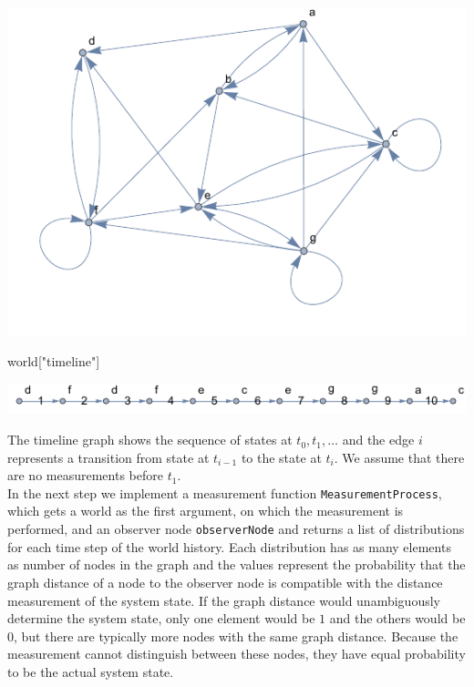 \documentclass{tstextbook}
\begin{document}
\begin{example}

\includegraphics[scale=0.9, center]{images/graph_world.pdf}

\begin{mathematica}
world["timeline"]
\end{mathematica}
\includegraphics[scale=1.2, center]{images/state_history.pdf}

The timeline graph shows the sequence of states at $t_0,t_1,\ldots$ and the edge $i$ represents a transition from state at $t_{i-1}$ to the state at $t_{i}$. We assume that there are no measurements before $t_1$.\\ 

In the next step we implement a measurement function \texttt{MeasurementProcess}, which gets a world as the first argument, on which the measurement is performed, and an observer node \texttt{observerNode} and returns a list of distributions for each time step of the world history. Each distribution has as many elements as number of nodes in the graph and the values represent the probability that the graph distance of a node to the observer node is compatible with the distance measurement of the system state. If the graph distance would unambiguously determine the system state, only one element would be $1$ and the others would be $0$, but there are typically more nodes with the same graph distance. Because the measurement cannot distinguish between these nodes, they have equal probability to be the actual system state.\\


\end{example}
\end{document}

